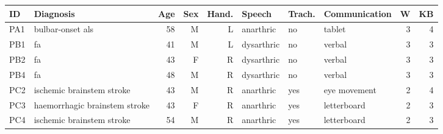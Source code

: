 \footnotesize
\begin{tabular}{@{}llrrrlllrr@{}}
  \toprule
  \textbf{ID}  & \textbf{Diagnosis} & \textbf{Age} & \textbf{Sex} & \textbf{Hand.} &
  \textbf{Speech} & \textbf{Trach.} & \textbf{Communication} &
  \textbf{W} & \textbf{KB} \\ \midrule
  PA1 & bulbar-onset \acs{als} & 58  & M   & L     & anarthric  & no          & tablet                 & 3  & 4 \\
  PB1 & \acs{fa} & 41  & M   & L     & dysarthric & no          & verbal                 & 3  & 3 \\
  PB2 & \acs{fa} & 43  & F   & R     & dysarthric & no          & verbal                 & 3  & 3 \\
  PB4 & \acs{fa} & 48  & M   & R     & dysarthric & no          & verbal                 & 3  & 3 \\
  PC2 & ischemic brainstem stroke & 43  & M   & R     & anarthric  & yes  &  eye movement & 2 & 4  \\
  PC3 & haemorrhagic brainstem stroke & 43  & F   & R     & anarthric  & yes         & letterboard            & 2  & 3 \\
  PC4 & ischemic brainstem stroke & 54  & M   & R     & anarthric  & yes & letterboard & 2 & 3 \\
  \bottomrule
\end{tabular}
